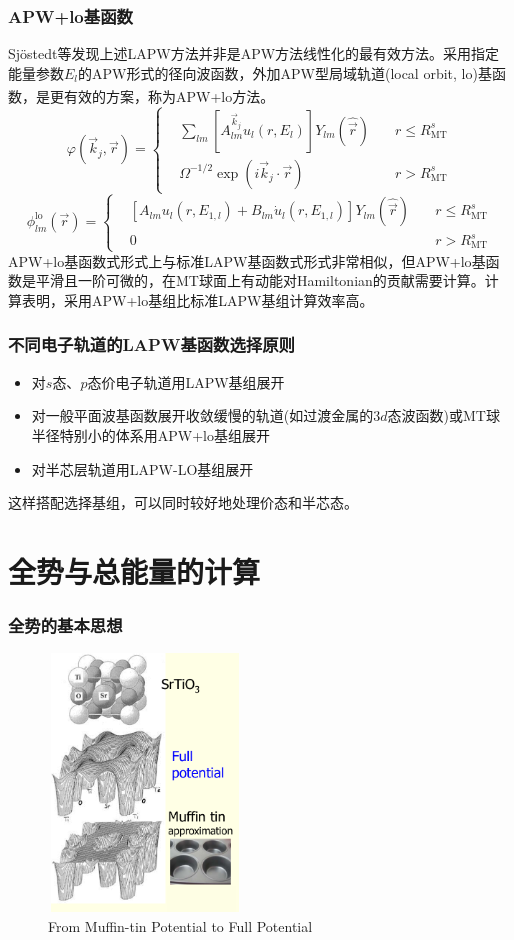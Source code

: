 \documentclass[cjk,slidestop,compress,mathserif,blue]{beamer}
\newcommand{\upcite}[1]{\hspace{0ex}\textsuperscript{\cite{#1}}} %
\begin{document}
\frame
{
\frametitle{\textrm{APW+lo}基函数}
\textrm{Sj\"ostedt}等发现上述\textrm{LAPW}方法并非是\textrm{APW}方法线性化的最有效方法。采用指定能量参数$E_l$的\textrm{APW}形式的径向波函数，外加\textrm{APW}型局域轨道(\textrm{local orbit, lo})基函数，是更有效的方案，称为\textrm{APW+lo}方法\upcite{SSC114-15_2000}。
$$  \varphi(\vec k_j,\vec r)=\left\{
  \begin{aligned}
    &\sum_{lm}[A^{\vec k_j}_{lm}u_l(r,E_l)]Y_{lm}(\hat{\vec r})\quad&r\leqslant R_{\mathrm{MT}}^s\\
    &\Omega^{-1/2}\exp(i\vec k_j\cdot\vec r) &r>R_{\mathrm{MT}}^s
  \end{aligned}\right.
  \label{eq:APW-basis}
$$
$$  \phi_{lm}^{\mathrm{lo}}(\vec r)=\left\{
  \begin{aligned}
  &[A_{lm}u_l(r,E_{1,l})+B_{lm}\dot u_l(r,E_{1,l})]Y_{lm}(\hat{\vec r})\quad&r\leqslant R_{\mathrm{MT}}^s\\
  &0&r>R_{\mathrm{MT}}^s
  \end{aligned}
\right.$$
\textrm{APW+lo}基函数式形式上与标准\textrm{LAPW}基函数式形式非常相似，但\textrm{APW+lo}基函数是平滑且一阶可微的，在\textrm{MT}球面上有动能对\textrm{Hamiltonian}的贡献需要计算。计算表明，采用\textrm{APW+lo}基组比标准\textrm{LAPW}基组计算效率高。
}

\frame
{
	\frametitle{不同电子轨道的\textrm{LAPW}基函数选择原则}
\vskip 10pt
\begin{itemize}
\setlength{\itemsep}{15pt}
	\item 对$s$态、$p$态价电子轨道用\textrm{LAPW}基组展开
	\item 对一般平面波基函数展开收敛缓慢的轨道(如过渡金属的3$d$态波函数)或\textrm{MT}球半径特别小的体系用\textrm{APW+lo}基组展开
	\item 对半芯层轨道用\textrm{LAPW-LO}基组展开
\end{itemize}
这样搭配选择基组，可以同时较好地处理价态和半芯态。
}

\section{全势与总能量的计算}
\frame
{
\frametitle{全势的基本思想}
\vspace*{-13pt}
\begin{figure}[h!]
\centering
\includegraphics[height=2.70in,width=2.02in,viewport=1 22 507 715,clip]{Figures/MT_FP.png}
\caption{\tiny \textrm{From Muffin-tin Potential to Full Potential}}%
\label{Muffin_tin_FP}
\end{figure}
}
\end{document}
